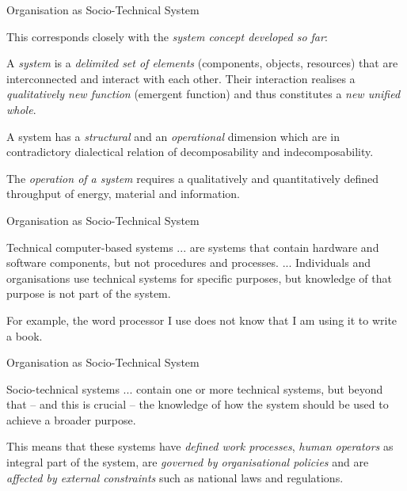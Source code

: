 \documentclass{beamer}
\begin{document}
\begin{frame}{Organisation as Socio-Technical System}

This corresponds closely with the \emph{system concept developed so far}:

  A \emph{system} is a \emph{delimited set of elements} (components, objects,
  resources) that are interconnected and interact with each other. Their
  interaction realises a \emph{qualitatively new function} (emergent function)
  and thus constitutes a \emph{new unified whole}.

  A system has a \emph{structural} and an \emph{operational} dimension which
  are in contradictory dialectical relation of decomposability and
  indecomposability.

  The \emph{operation of a system} requires a qualitatively and quantitatively
  defined throughput of energy, material and information.
  
\end{frame}


\begin{frame}{Organisation as Socio-Technical System}
  \begin{block} {Technical computer-based systems}
    ... are systems that contain hardware and software components, but not
    procedures and processes. ... Individuals and organisations use technical
    systems for specific purposes, but knowledge of that purpose is not part
    of the system.\medskip

    For example, the word processor I use does not know that I am using it to
    write a book.
  \end{block}

\end{frame}

\begin{frame}{Organisation as Socio-Technical System}

  \begin{block}{Socio-technical systems}
    ... contain one or more technical systems, but beyond that -- and this is
    crucial -- the knowledge of how the system should be used to achieve a
    broader purpose.\medskip

    This means that these systems have \emph{defined work processes},
    \emph{human operators} as integral part of the system, are \emph{governed
      by organisational policies} and are \emph{affected by external
      constraints} such as national laws and regulations.
  \end{block}

\end{frame}
\end{document}
